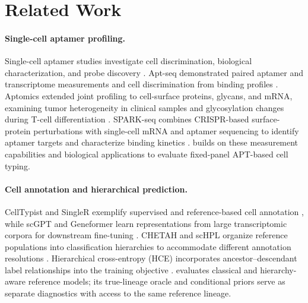 \section{Related Work}

\paragraph{Single-cell aptamer profiling.} Single-cell aptamer studies investigate cell discrimination, biological characterization, and probe discovery \citep{xu2024aptamer,wu2024efficient}. Apt-seq demonstrated paired aptamer and transcriptome measurements and cell discrimination from binding profiles \citep{delley2018combined}. Aptomics extended joint profiling to cell-surface proteins, glycans, and mRNA, examining tumor heterogeneity in clinical samples and glycosylation changes during T-cell differentiation \citep{wu2025high}. SPARK-seq combines CRISPR-based surface-protein perturbations with single-cell mRNA and aptamer sequencing to identify aptamer targets and characterize binding kinetics \citep{luo2026spark}. \ourbench{} builds on these measurement capabilities and biological applications to evaluate fixed-panel APT-based cell typing.

\paragraph{Cell annotation and hierarchical prediction.} CellTypist and SingleR exemplify supervised and reference-based cell annotation \citep{dominguez2022cross,aran2019reference}, while scGPT and Geneformer learn representations from large transcriptomic corpora for downstream fine-tuning \citep{cui2024scgpt,theodoris2023transfer}. CHETAH and scHPL organize reference populations into classification hierarchies to accommodate different annotation resolutions \citep{de2019chetah,michielsen2021hierarchical}. Hierarchical cross-entropy (HCE) incorporates ancestor--descendant label relationships into the training objective \citep{cultrera2026improving}. \ourbench{} evaluates classical and hierarchy-aware reference models; its true-lineage oracle and conditional priors serve as separate diagnostics with access to the same reference lineage.

